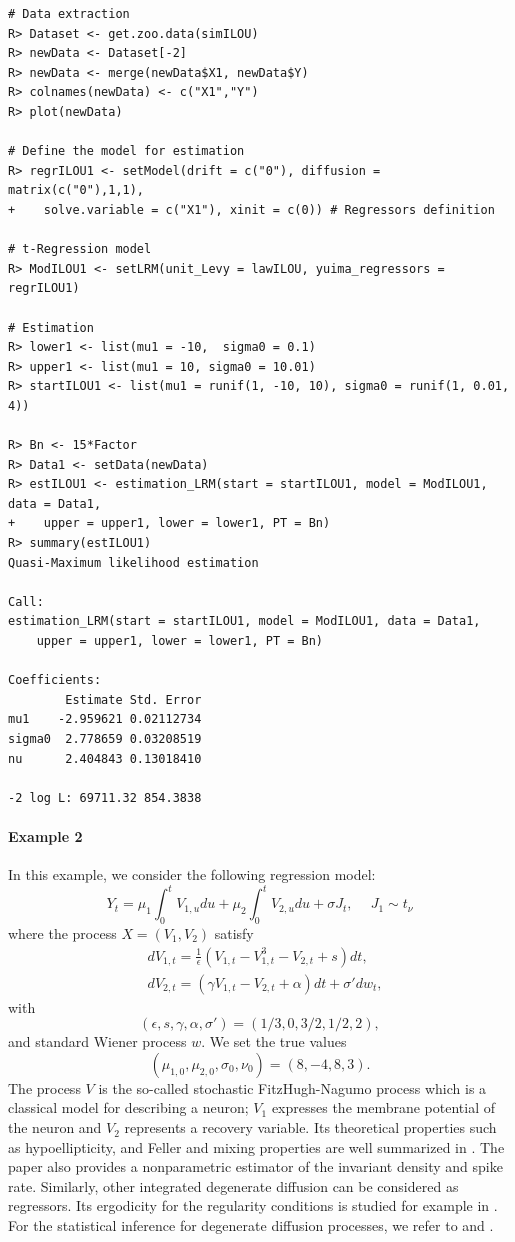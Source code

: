 \begin{verbatim}
# Data extraction
R> Dataset <- get.zoo.data(simILOU)
R> newData <- Dataset[-2]
R> newData <- merge(newData$X1, newData$Y)
R> colnames(newData) <- c("X1","Y")
R> plot(newData)

# Define the model for estimation
R> regrILOU1 <- setModel(drift = c("0"), diffusion = matrix(c("0"),1,1),
+    solve.variable = c("X1"), xinit = c(0)) # Regressors definition

# t-Regression model
R> ModILOU1 <- setLRM(unit_Levy = lawILOU, yuima_regressors = regrILOU1)

# Estimation
R> lower1 <- list(mu1 = -10,  sigma0 = 0.1)
R> upper1 <- list(mu1 = 10, sigma0 = 10.01)
R> startILOU1 <- list(mu1 = runif(1, -10, 10), sigma0 = runif(1, 0.01, 4))

R> Bn <- 15*Factor
R> Data1 <- setData(newData)
R> estILOU1 <- estimation_LRM(start = startILOU1, model = ModILOU1, data = Data1,
+    upper = upper1, lower = lower1, PT = Bn)
R> summary(estILOU1)
Quasi-Maximum likelihood estimation

Call:
estimation_LRM(start = startILOU1, model = ModILOU1, data = Data1,
    upper = upper1, lower = lower1, PT = Bn)

Coefficients:
        Estimate Std. Error
mu1    -2.959621 0.02112734
sigma0  2.778659 0.03208519
nu      2.404843 0.13018410

-2 log L: 69711.32 854.3838
\end{verbatim}

\paragraph{Example 2}\label{example-2}

In this example, we consider the following regression model:
\begin{equation}
Y_t= \mu_1\int_0^t V_{1,u}du+\mu_2\int_0^t V_{2,u}du+\sigma J_t, \ \quad J_1\sim
\label{eq:yuex2}
t_\nu\end{equation}
where the process \(X=(V_{1},V_{2})\) satisfy
\begin{align}
&dV_{1,t}=\frac{1}{\epsilon}(V_{1,t}-V_{1,t}^3-V_{2,t}+s)dt,\\
&dV_{2,t}=(\gamma V_{1,t}-V_{2,t}+\alpha)dt+\sigma' dw_t,
\end{align}
with
\[(\epsilon, s, \gamma, \alpha,\sigma')=(1/3, 0, 3/2, 1/2,2),\]
and standard Wiener process \(w\).
We set the true values
\[(\mu_{1,0},\mu_{2,0},\sigma_0,\nu_0)=(8,-4,8,3).\]
The process \(V\) is the so-called stochastic FitzHugh-Nagumo process which is a classical model for describing a neuron; \(V_{1}\) expresses the membrane potential of the neuron and \(V_{2}\) represents a recovery variable.
Its theoretical properties such as hypoellipticity, and Feller and mixing properties are well summarized in \citet{LeoSam18}.
The paper also provides a nonparametric estimator of the invariant density and spike rate.
Similarly, other integrated degenerate diffusion can be considered as regressors.
Its ergodicity for the regularity conditions is studied for example in \citet{Wu01}.
For the statistical inference for degenerate diffusion processes, we refer to \citet{DitSam19} and \citet{GloYos21}.

